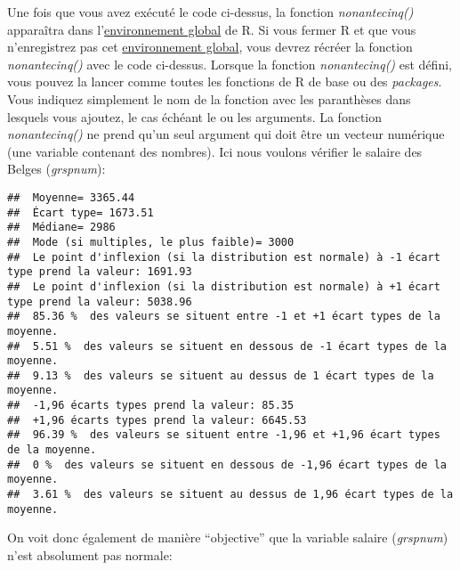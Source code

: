\documentclass[
]{book}
\newenvironment{Shaded}{\begin{snugshade}}{\end{snugshade}}
\newcommand{\FunctionTok}[1]{\textcolor[rgb]{0.00,0.00,0.00}{#1}}
\newcommand{\NormalTok}[1]{#1}
\newcommand{\SpecialCharTok}[1]{\textcolor[rgb]{0.00,0.00,0.00}{#1}}
\begin{document}
Une fois que vous avez exécuté le code ci-dessus, la fonction \emph{nonantecinq()} apparaîtra dans l'\protect\hyperlink{objets_envir}{environnement global} de R. Si vous fermer R et que vous n'enregistrez pas cet \protect\hyperlink{objets_envir}{environnement global}, vous devrez récréer la fonction \emph{nonantecinq()} avec le code ci-dessus. Lorsque la fonction \emph{nonantecinq()} est défini, vous pouvez la lancer comme toutes les fonctions de R de base ou des \emph{packages}. Vous indiquez simplement le nom de la fonction avec les paranthèses dans lesquels vous ajoutez, le cas échéant le ou les arguments. La fonction \emph{nonantecinq()} ne prend qu'un seul argument qui doit être un vecteur numérique (une variable contenant des nombres). Ici nous voulons vérifier le salaire des Belges (\emph{grspnum}):

\begin{Shaded}
\end{Shaded}

\begin{verbatim}
##  Moyenne= 3365.44 
##  Écart type= 1673.51 
##  Médiane= 2986 
##  Mode (si multiples, le plus faible)= 3000 
##  Le point d'inflexion (si la distribution est normale) à -1 écart type prend la valeur: 1691.93 
##  Le point d'inflexion (si la distribution est normale) à +1 écart type prend la valeur: 5038.96 
##  85.36 %  des valeurs se situent entre -1 et +1 écart types de la moyenne. 
##  5.51 %  des valeurs se situent en dessous de -1 écart types de la moyenne. 
##  9.13 %  des valeurs se situent au dessus de 1 écart types de la moyenne. 
##  -1,96 écarts types prend la valeur: 85.35 
##  +1,96 écarts types prend la valeur: 6645.53 
##  96.39 %  des valeurs se situent entre -1,96 et +1,96 écart types de la moyenne. 
##  0 %  des valeurs se situent en dessous de -1,96 écart types de la moyenne. 
##  3.61 %  des valeurs se situent au dessus de 1,96 écart types de la moyenne.
\end{verbatim}

On voit donc également de manière ``objective'' que la variable salaire (\emph{grspnum}) n'est absolument pas normale:
\end{document}
